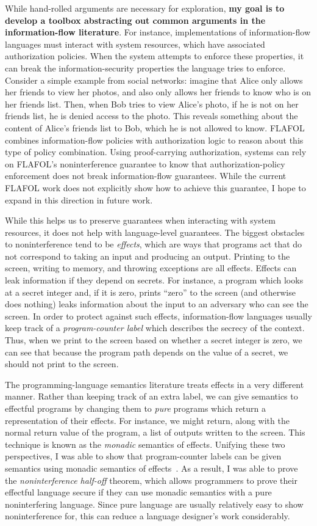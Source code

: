 \documentclass{article}
\theoremstyle{definition}
\begin{document}
While hand-rolled arguments are necessary for exploration, \textbf{my goal is to develop a toolbox abstracting out common arguments in the information-flow literature}.
For instance, implementations of information-flow languages must interact with system resources, which have associated authorization policies.
When the system attempts to enforce these properties, it can break the information-security properties the language tries to enforce.
Consider a simple example from social networks: imagine that Alice only allows her friends to view her photos, and also only allows her friends to know who is on her friends list.
Then, when Bob tries to view Alice's photo, if he is not on her friends list, he is denied access to the photo.
This reveals something about the content of Alice's friends list to Bob, which he is not allowed to know.
FLAFOL~\citep{HirschACAT20} combines information-flow policies with authorization logic to reason about this type of policy combination.
Using proof-carrying authorization, systems can rely on FLAFOL's noninterference guarantee to know that authorization-policy enforcement does not break information-flow guarantees.
While the current FLAFOL work does not explicitly show how to achieve this guarantee, I hope to expand in this direction in future work.

While this helps us to preserve guarantees when interacting with system resources, it does not help with language-level guarantees.
The biggest obstacles to noninterference tend to be \emph{effects}, which are ways that programs act that do not correspond to taking an input and producing an output.
Printing to the screen, writing to memory, and throwing exceptions are all effects.
Effects can leak information if they depend on secrets.
For instance, a program which looks at a secret integer and, if it is zero, prints ``zero'' to the screen (and otherwise does nothing) leaks information about the input to an adversary who can see the screen.
In order to protect against such effects, information-flow languages usually keep track of a \emph{program-counter label} which describes the secrecy of the context.
Thus, when we print to the screen based on whether a secret integer is zero, we can see that because the program path depends on the value of a secret, we should not print to the screen.

The programming-language semantics literature treats effects in a very different manner.
Rather than keeping track of an extra label, we can give semantics to effectful programs by changing them to \emph{pure} programs which return a representation of their effects.
For instance, we might return, along with the normal return value of the program, a list of outputs written to the screen.
This technique is known as the \emph{monadic} semantics of effects.
Unifying these two perspectives, I was able to show that program-counter labels can be given semantics using monadic semantics of effects~\citep{HirschC21}.
As a result, I was able to prove the \emph{noninterference half-off} theorem, which allows programmers to prove their effectful language secure if they can use monadic semantics with a pure noninterfering language.
Since pure language are usually relatively easy to show noninterference for, this can reduce a language designer's work considerably.
\end{document}
